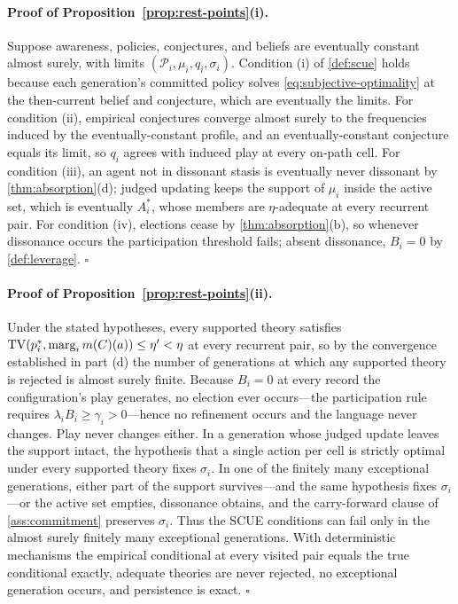 \paragraph{Proof of Proposition~\ref{prop:rest-points}(i).}
Suppose awareness, policies, conjectures, and beliefs are eventually
constant almost surely, with limits $(\mathcal P_i,\mu_i,q_i,\sigma_i)$.
Condition (i) of \cref{def:scue} holds because each generation's committed
policy solves \cref{eq:subjective-optimality} at the then-current belief
and conjecture, which are eventually the limits.  For condition (ii),
empirical conjectures converge almost surely to the frequencies induced by
the eventually-constant profile, and an eventually-constant conjecture
equals its limit, so $q_i$ agrees with induced play at every on-path cell.
For condition (iii), an agent not in dissonant stasis is eventually never
dissonant by \cref{thm:absorption}(d); judged updating keeps the support of
$\mu_i$ inside the active set, which is eventually $A_i^{*}$, whose members
are $\eta$-adequate at every recurrent pair.  For condition (iv), elections
cease by \cref{thm:absorption}(b), so whenever dissonance occurs the
participation threshold fails; absent dissonance, $B_i=0$ by
\cref{def:leverage}.  \hfill$\square$

\paragraph{Proof of Proposition~\ref{prop:rest-points}(ii).}
Under the stated hypotheses, every supported theory satisfies
$\operatorname{TV}(p_i^{*},\operatorname{marg}_{i}m(C)(a))\leq\eta'<\eta$ at every recurrent pair, so by
the convergence established in part (d) the number of generations at which
any supported theory is rejected is almost surely finite.  Because
$B_i=0$ at every record the configuration's play generates, no election
ever occurs---the participation rule requires
$\lambda_iB_i\geq\gamma_i>0$---hence no refinement occurs and the language
never changes.  Play never changes either.  In a generation whose judged
update leaves the support intact, the hypothesis that a single action per
cell is strictly optimal under every supported theory fixes $\sigma_i$.  In
one of the finitely many exceptional generations, either part of the
support survives---and the same hypothesis fixes $\sigma_i$---or the active
set empties, dissonance obtains, and the carry-forward clause of
\cref{ass:commitment} preserves $\sigma_i$.  Thus the SCUE conditions can
fail only in the almost surely finitely many exceptional generations.  With
deterministic mechanisms the empirical conditional at every visited pair
equals the true conditional exactly, adequate theories are never rejected,
no exceptional generation occurs, and persistence is exact.
\hfill$\square$

